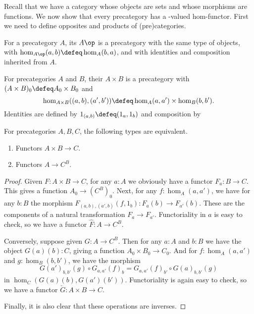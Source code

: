 Recall that we have a category \uset whose objects are sets and whose morphisms are functions.
We now show that every precategory has a \uset-valued hom-functor.
First we need to define opposites and products of (pre)categories.

\begin{defn}\label{ct:opposite-category}
  For a precategory $A$, its 
  $A\op$ is a precategory with the same type of objects, with $\hom_{A\op}(a,b) \defeq \hom_A(b,a)$, and with identities and composition inherited from $A$.
\end{defn}

\begin{defn}\label{ct:prod-cat}
  For precategories $A$ and $B$, their 
  $A\times B$ is a precategory with $(A\times B)_0 \defeq A_0 \times B_0$ and
  \[\hom_{A\times B}((a,b),(a',b')) \defeq \hom_A(a,a') \times \hom_B(b,b').\]
  Identities are defined by $1_{(a,b)}\defeq (1_a,1_b)$ and composition by
\end{defn}

\begin{lem}\label{ct:functorexpadj}
  For precategories $A,B,C$, the following types are equivalent.
  \begin{enumerate}
  \item Functors $A\times B\to C$.
  \item Functors $A\to C^B$.
  \end{enumerate}
\end{lem}
\begin{proof}
  Given $F:A\times B\to C$, for any $a:A$ we obviously have a functor $F_a : B\to C$.
  This gives a function $A_0 \to (C^B)_0$.
  Next, for any $f:\hom_A(a,a')$, we have for any $b:B$ the morphism $F_{(a,b),(a',b)}(f,1_b):F_a(b) \to F_{a'}(b)$.
  These are the components of a natural transformation $F_a \to F_{a'}$.
  Functoriality in $a$ is easy to check, so we have a functor $\hat{F}:A\to C^B$.

  Conversely, suppose given $G:A\to C^B$.
  Then for any $a:A$ and $b:B$ we have the object $G(a)(b):C$, giving a function $A_0 \times B_0 \to C_0$.
  And for $f:\hom_A(a,a')$ and $g:\hom_B(b,b')$, we have the morphism
  \begin{equation*}
     G(a')_{b,b'}(g)\circ G_{a,a'}(f)_b = G_{a,a'}(f)_{b'} \circ  G(a)_{b,b'}(g)
  \end{equation*}
  in $\hom_C(G(a)(b), G(a')(b'))$.
  Functoriality is again easy to check, so we have a functor $\check{G}:A\times B \to C$.

  Finally, it is also clear that these operations are inverses.
\end{proof}

